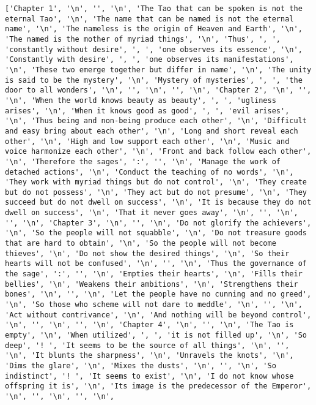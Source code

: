 \documentclass[12pt,a4paper,oneside]{book}
\begin{document}
\begin{verbatim}
['Chapter 1', '\n', '', '\n', 'The Tao that can be spoken is not the eternal Tao', '\n', 'The name that can be named is not the eternal name', '\n', 'The nameless is the origin of Heaven and Earth', '\n', 'The named is the mother of myriad things', '\n', 'Thus', ', ', 'constantly without desire', ', ', 'one observes its essence', '\n', 'Constantly with desire', ', ', 'one observes its manifestations', '\n', 'These two emerge together but differ in name', '\n', 'The unity is said to be the mystery', '\n', 'Mystery of mysteries', ', ', 'the door to all wonders', '\n', '', '\n', '', '\n', 'Chapter 2', '\n', '', '\n', 'When the world knows beauty as beauty', ', ', 'ugliness arises', '\n', 'When it knows good as good', ', ', 'evil arises', '\n', 'Thus being and non-being produce each other', '\n', 'Difficult and easy bring about each other', '\n', 'Long and short reveal each other', '\n', 'High and low support each other', '\n', 'Music and voice harmonize each other', '\n', 'Front and back follow each other', '\n', 'Therefore the sages', ':', '', '\n', 'Manage the work of detached actions', '\n', 'Conduct the teaching of no words', '\n', 'They work with myriad things but do not control', '\n', 'They create but do not possess', '\n', 'They act but do not presume', '\n', 'They succeed but do not dwell on success', '\n', 'It is because they do not dwell on success', '\n', 'That it never goes away', '\n', '', '\n', '', '\n', 'Chapter 3', '\n', '', '\n', 'Do not glorify the achievers', '\n', 'So the people will not squabble', '\n', 'Do not treasure goods that are hard to obtain', '\n', 'So the people will not become thieves', '\n', 'Do not show the desired things', '\n', 'So their hearts will not be confused', '\n', '', '\n', 'Thus the governance of the sage', ':', '', '\n', 'Empties their hearts', '\n', 'Fills their bellies', '\n', 'Weakens their ambitions', '\n', 'Strengthens their bones', '\n', '', '\n', 'Let the people have no cunning and no greed', '\n', 'So those who scheme will not dare to meddle', '\n', '', '\n', 'Act without contrivance', '\n', 'And nothing will be beyond control', '\n', '', '\n', '', '\n', 'Chapter 4', '\n', '', '\n', 'The Tao is empty', '\n', 'When utilized', ', ', 'it is not filled up', '\n', 'So deep', '! ', 'It seems to be the source of all things', '\n', '', '\n', 'It blunts the sharpness', '\n', 'Unravels the knots', '\n', 'Dims the glare', '\n', 'Mixes the dusts', '\n', '', '\n', 'So indistinct', '! ', 'It seems to exist', '\n', 'I do not know whose offspring it is', '\n', 'Its image is the predecessor of the Emperor', '\n', '', '\n', '', '\n', 


\end{verbatim}
\end{document}
